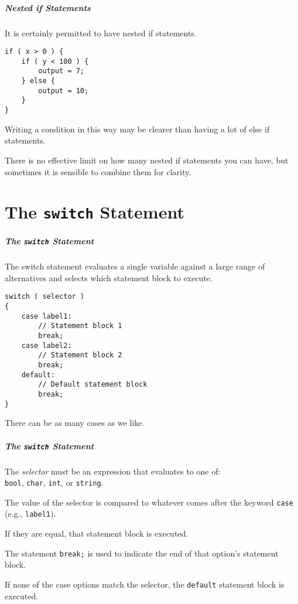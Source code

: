 \begin{frame}[fragile]
\frametitle{Nested if Statements}
It is certainly permitted to have \alert{nested} if statements.

\begin{verbatim}
if ( x > 0 ) {
    if ( y < 100 ) {
        output = 7;
    } else {
        output = 10;
    }
}
\end{verbatim}

Writing a condition in this way may be clearer than having a lot of else if statements.

There is no effective limit on how many nested if statements you can have, but sometimes it is sensible to combine them for clarity.

\end{frame}

\part{The \texttt{switch} Statement}
\begin{frame}\partpage\end{frame}

\begin{frame}[fragile]
\frametitle{The \texttt{switch} Statement}

The switch statement evaluates a single variable against a large range of alternatives and selects which statement block to execute.

\begin{verbatim}
switch ( selector )
{
    case label1:
        // Statement block 1
        break;
    case label2:
        // Statement block 2
        break;
    default:
        // Default statement block
        break;
}
\end{verbatim}

There can be as many cases as we like.

\end{frame}

\begin{frame}
\frametitle{The \texttt{switch} Statement}

The \textit{selector} must be an expression that evaluates to one of: \\
\quad \texttt{bool}, \texttt{char}, \texttt{int}, or \texttt{string}.


The value of the selector is compared to whatever comes after the keyword \texttt{case} (e.g., \texttt{label1}).

If they are equal, that statement block is executed.

The statement \texttt{break;} is used to indicate the end of that option's statement block.

If none of the case options match the selector, the \texttt{default} statement block is executed.

\end{frame}

